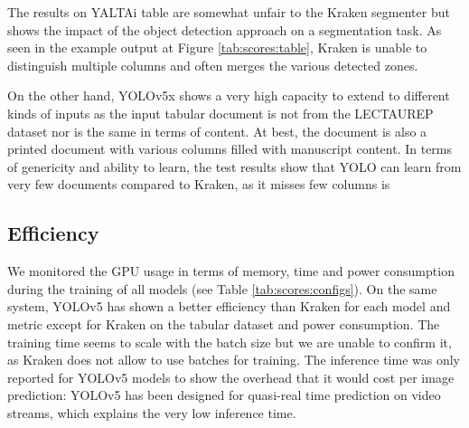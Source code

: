 \documentclass{jdmdh}
\begin{document}
The results on YALTAi table are somewhat unfair to the Kraken segmenter but shows the impact of the object detection approach on a segmentation task. As seen in the example output at Figure \ref{tab:scores:table}, Kraken is unable to distinguish multiple columns and often merges the various detected zones. 

On the other hand, YOLOv5x shows a very high capacity to extend to different kinds of inputs as the input tabular document is not from the LECTAUREP dataset nor is the same in terms of content. At best, the document is also a printed document with various columns filled with manuscript content. In terms of genericity and ability to learn, the test results show that YOLO can learn from very few documents compared to Kraken, as it misses few columns is

\subsection{Efficiency}

We monitored the GPU usage in terms of memory, time and power consumption during the training of all models (see Table \ref{tab:scores:configs}). On the same system, YOLOv5 has shown a better efficiency than Kraken for each model and metric except for Kraken on the tabular dataset and power consumption. The training time seems to scale with the batch size but we are unable to confirm it, as Kraken does not allow to use batches for training. The inference time was only reported for YOLOv5 models to show the overhead that it would cost per image prediction: YOLOv5 has been designed for quasi-real time prediction on video streams, which explains the very low inference time.
\end{document}
